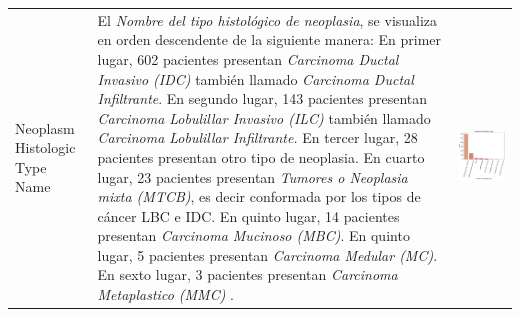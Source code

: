 \begin{table}[!htb]
	\footnotesize
	\begin{threeparttable}
		\begin{tabular}{p{2.5cm} p{7cm} p{6.5cm}} \toprule
			
			Neoplasm Histologic Type Name
			& El \textit{Nombre del tipo histológico de neoplasia}, se visualiza en orden descendente de la siguiente manera: En primer lugar, 602 pacientes presentan \textit{Carcinoma Ductal Invasivo (IDC)} también llamado \textit{Carcinoma Ductal Infiltrante}. En segundo lugar, 143 pacientes presentan \textit{Carcinoma Lobulillar Invasivo (ILC)} también llamado \textit{Carcinoma Lobulillar Infiltrante.} En tercer lugar, 28 pacientes presentan otro tipo de neoplasia. En cuarto lugar, 23 pacientes presentan \textit{Tumores o Neoplasia mixta (MTCB)}, es decir conformada por los tipos de cáncer LBC e IDC. En quinto lugar, 14 pacientes presentan \textit{Carcinoma Mucinoso (MBC)}. En quinto lugar, 5 pacientes presentan \textit{Carcinoma Medular (MC)}. En sexto lugar, 3 pacientes presentan \textit{Carcinoma Metaplastico (MMC)}
			.
			& \begin{center}\includegraphics[width=1\linewidth]{NOTEBOOK/IMAGENES_DESCRIPTIVAS/18_neoplasm_histologic_type}\end{center}

\end{tabular}
\end{threeparttable}
\end{table}
